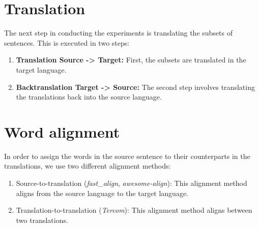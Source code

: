 \section{Translation}
\label{sec:Base_Experiment:Translation}

The next step in conducting the experiments is translating the subsets of sentences. This is executed in two steps:

\begin{enumerate}
    \item \textbf{Translation Source -> Target:} 
    First, the subsets are translated in the target language.
    \item \textbf{Backtranslation Target -> Source:}
    The second step involves translating the translations back into the source language.
\end{enumerate}




\section{Word alignment}
\label{sec:Base_Experiment:Alignment}


In order to assign the words in the source sentence to their counterparts in the translations, we use two different alignment methods:

\begin{enumerate}
    \item Source-to-translation (\textit{fast\_align}, \textit{awesome-align}): This alignment method aligns from the source language to the target language.
    \item Translation-to-translation (\textit{Tercom}): This alignment method aligns between two translations.
\end{enumerate}


